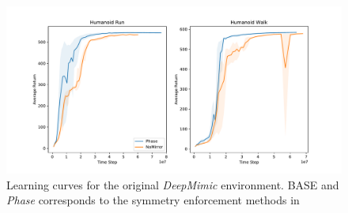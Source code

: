 \begin{figure}
  \centering
  \includegraphics[width=0.9\columnwidth]{symmetry_figures/DeepMimic_curves.pdf}
  \caption{Learning curves for the original \textit{DeepMimic} environment. BASE and \textit{Phase} corresponds to the symmetry enforcement methods in }
  \label{fig:deepmimic-curves}
\end{figure}